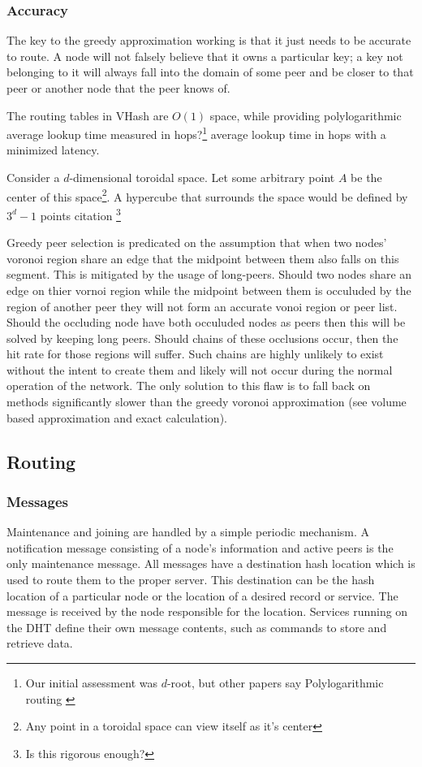 \documentclass{IEEEtran}
\begin{document}
\subsubsection*{Accuracy}

The key to the greedy approximation working is that it just needs to be accurate to route.  A node will not falsely believe that it owns a particular key; a key not belonging to it will always fall into the domain of some peer and be closer to that peer or another node that the peer knows of.


The routing tables in VHash are $O(1)$ space, while providing polylogarithmic  average lookup time measured in hops?\footnote{Our initial assessment was $d$-root, but other papers say Polylogarithmic routing \cite{kleinberg2000navigation} \cite{raynet}} average lookup time in hops with a minimized latency.


Consider a $d$-dimensional toroidal space.  Let some arbitrary point $A$ be the center of this space\footnote{Any point in a toroidal space can view itself as it's center}.  A hypercube that surrounds the space would be defined by $3^d -1$ points citation \footnote{Is this rigorous enough?}

Greedy peer selection is predicated on the assumption that when two nodes' voronoi region share an edge that the midpoint between them also falls on this segment. This is mitigated by the usage of long-peers. Should two nodes share an edge on thier vornoi region while the midpoint between them is occuluded by the region of another peer they will not form an accurate vonoi region or peer list. Should the occluding node have both occuluded nodes as peers then this will be solved by keeping long peers. Should chains of these occlusions occur, then the hit rate for those regions will suffer. Such chains are highly unlikely to exist without the intent to create them and likely will not occur during the normal operation of the network. The only solution to this flaw is to fall back on methods significantly slower than the greedy voronoi approximation (see volume based approximation and exact calculation).






\subsection{Routing}

\subsubsection{Messages}
Maintenance and joining are handled by a simple periodic mechanism. A notification message consisting of a node's information and active peers is the only maintenance message. All messages have a destination hash location which is used to route them to the proper server. This destination can be the hash location of a particular node or the location of a desired record or service.  The message is received by the node responsible for the location. Services running on the DHT define their own message contents, such as commands to store and retrieve data.
\end{document}

